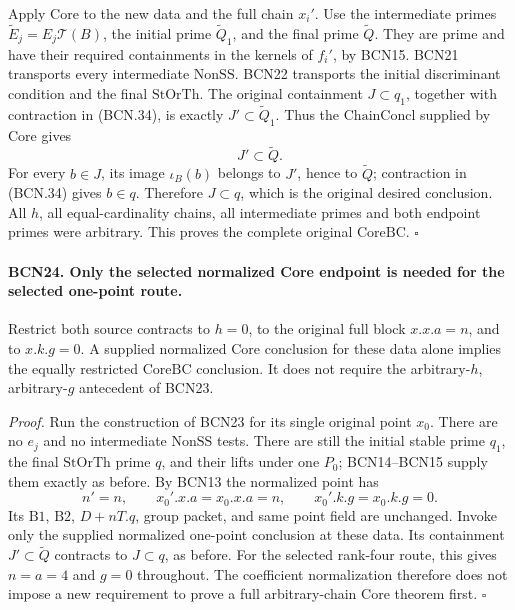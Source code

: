 Apply \(\mathrm{Core}\) to the new data and the full
chain \(x_i'\).
Use the intermediate primes
\(\widetilde E_j=E_j\mathscr T(B)\), the initial
prime \(\widetilde Q_1\), and the final prime
\(\widetilde Q\).
They are prime and have their required containments
in the kernels of \(f_i'\), by BCN15.
BCN21 transports every intermediate \(\mathrm{NonSS}\).
BCN22 transports the initial discriminant condition
and the final \(\mathrm{StOrTh}\).
The original containment \(J\subset q_1\), together
with contraction in (BCN.34), is exactly
\(J'\subset\widetilde Q_1\).
Thus the \(\mathrm{ChainConcl}\) supplied by
\(\mathrm{Core}\) gives
\[
 J'\subset\widetilde Q .
\]
For every \(b\in J\), its image \(\iota_B(b)\) belongs
to \(J'\), hence to \(\widetilde Q\); contraction in
(BCN.34) gives \(b\in q\).  Therefore \(J\subset q\),
which is the original desired conclusion.
All \(h\), all equal-cardinality chains, all intermediate
primes and both endpoint primes were arbitrary.
This proves the complete original \(\mathrm{CoreBC}\).
\hfill\(\square\)

\paragraph{BCN24. Only the selected normalized Core endpoint is needed
for the selected one-point route.}\label{claim:BCN24}
Restrict both source contracts to \(h=0\), to the original
full block \(x.x.a=n\), and to \(x.k.g=0\).
A supplied normalized \(\mathrm{Core}\) conclusion for
these data alone implies the equally restricted
\(\mathrm{CoreBC}\) conclusion.
It does not require the arbitrary-\(h\), arbitrary-\(g\)
antecedent of BCN23.

\emph{Proof.}
Run the construction of BCN23 for its single original
point \(x_0\).  There are no \(e_j\) and no intermediate
\(\mathrm{NonSS}\) tests.  There are still the initial
stable prime \(q_1\), the final \(\mathrm{StOrTh}\) prime
\(q\), and their lifts under one \(P_0\); BCN14--BCN15
supply them exactly as before.
By BCN13 the normalized point has
\[
 n'=n,\qquad x_0'.x.a=x_0.x.a=n,\qquad
 x_0'.k.g=x_0.k.g=0 .                                         \tag{BCN.48}
\]
Its \(\mathrm{B1}\), \(\mathrm{B2}\), \(D+nT.q\), group
packet, and same point field are unchanged.
Invoke only the supplied normalized one-point conclusion
at these data.  Its containment \(J'\subset\widetilde Q\)
contracts to \(J\subset q\), as before.
For the selected rank-four route, this gives \(n=a=4\)
and \(g=0\) throughout.  The coefficient normalization
therefore does not impose a new requirement to prove
a full arbitrary-chain Core theorem first.
\hfill\(\square\)

